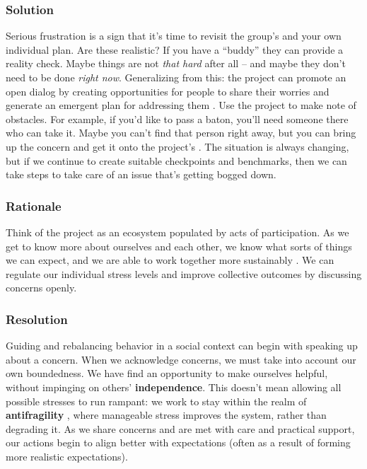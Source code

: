 \subsubsection*{Solution}

Serious frustration is a sign that it's time to revisit the group's  and your own individual plan.  Are these realistic?  If you have a ``buddy'' they can provide a reality check.   Maybe things are not \emph{that hard} after all -- and maybe they don't need to be done \emph{right now}.  Generalizing from this: the project can promote an open dialog by creating opportunities for people to share their worries and generate an emergent plan for addressing them \cite{seikkula2006dialogical}.  Use the project  to make note of obstacles.  For example, if you'd like to pass a baton, you'll need someone there who can take it.  Maybe you can't find that person right away, but you can bring up the concern and get it onto the project's .  The situation is always changing, but if we continue to create suitable checkpoints and benchmarks, then we can take steps to take care of an issue that's getting bogged down.    

\subsubsection*{Rationale}

Think of the project as an ecosystem populated by acts of participation.  As we get to know more about ourselves and each other, we know what sorts of things we can expect, and we are able to work together more sustainably \cite{ostrom2010revising}.
%
We can regulate our individual stress levels and improve collective outcomes by discussing concerns openly.

\subsubsection*{Resolution}

Guiding and rebalancing behavior in a social context can begin with speaking up about a concern.  When we acknowledge concerns, we must take into account our own boundedness.  We have find an opportunity to make ourselves helpful, without impinging on others' \textbf{independence}.   This doesn't mean allowing all possible stresses to run rampant: we work to stay within the realm of \textbf{antifragility} \cite{taleb2012antifragile}, where manageable stress improves the system, rather than degrading it. 
%
As we share concerns and are met with care and practical support, our actions begin to align better with expectations (often as a result of forming more realistic expectations). 

